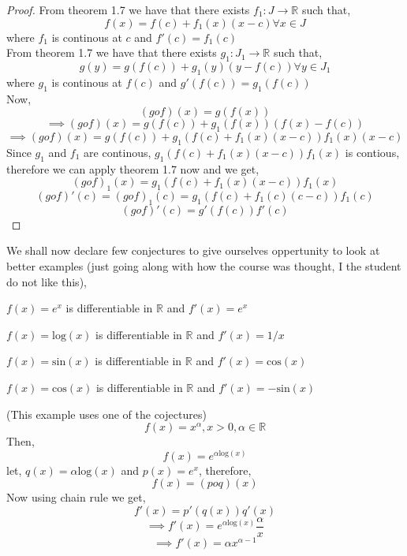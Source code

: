 \documentclass[11pt,a4paper]{colorart}
\def\R{\mathbb{R}}
\def\a{\alpha}
\def\ra{\rightarrow}
\begin{document}
\begin{proof}
	From theorem 1.7 we have that there exists $f_1:J\ra\R$ such that,
	\[ f(x) = f(c) + f_1(x)  (x-c) \forall x \in J\]
	where $f_1$ is continous at $c$ and $f'(c)=f_1(c)$\\
	From theorem 1.7 we have that there exists $g_1:J_1\ra\R$ such that,
	\[ g(y) = g(f(c)) + g_1(y)  (y-f(c)) \forall y \in J_1 \]
	where $g_1$ is continous at $f(c)$ and $g'(f(c))=g_1(f(c))$\\
	Now,
	\[ (gof)(x) = g(f(x)) \]
	\[ \implies (gof)(x) = g(f(c)) + g_1(f(x)) ( f(x) - f(c) ) \]
	\[ \implies (gof)(x) = g(f(c)) + g_1(f(c)+f_1(x)(x-c))f_1(x)(x-c) \]
	Since $g_1$ and $f_1$ are continous, $g_1(f(c)+f_1(x)(x-c))f_1(x)$ is contious, therefore we can apply theorem 1.7 now and we get, 
	\[ (gof)_1(x) = g_1(f(c)+f_1(x)(x-c))f_1(x) \]
	\[ (gof)'(c) = (gof)_1(c) = g_1(f(c)+f_1(c)(c-c))f_1(c) \]
	\[ (gof)'(c) = g'(f(c))f'(c) \]

\end{proof}

We shall now declare few conjectures to give ourselves oppertunity to look at better examples (just going along with how the course was thought, I the student do not like this),

\begin{conjecture}
	$f(x)=e^x$ is differentiable in $\R$ and $f'(x) = e^x$
\end{conjecture}

\begin{conjecture}
	$f(x)=\text{log}(x)$ is differentiable in $\R$ and $f'(x) = 1/x$
\end{conjecture}

\begin{conjecture}
	$f(x)=\text{sin}(x)$ is differentiable in $\R$ and $f'(x) = \text{cos}(x)$
\end{conjecture}

\begin{conjecture}
	$f(x)=\text{cos}(x)$ is differentiable in $\R$ and $f'(x) = -\text{sin}(x)$
\end{conjecture}

\begin{example}
	(This example uses one of the cojectures)
	\[ f(x) = x^\a, x > 0, \a\in\R \]
	Then,
	\[ f(x) = e^{\a\text{log}(x)} \]
	let, $q(x) = \a \text{log}(x)$ and $p(x) = e^x$, therefore,
	\[ f(x) = (poq)(x) \]
	Now using chain rule we get,
	\[ f'(x) = p'(q(x))q'(x) \]
	\[ \implies f'(x) = e^{\a\text{log}(x)} \frac{\a}{x} \]
	\[ \implies f'(x) = \a x^{\a-1} \]
\end{example}
\end{document}

